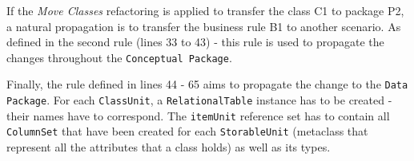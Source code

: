 If the \textit{Move Classes} refactoring is applied to transfer the class C1 to package P2, a natural propagation is to transfer the business rule B1 to another scenario. As defined in the second rule (lines 33 to 43) - this rule is used to propagate the changes throughout the \texttt{Conceptual Package}.




 Finally, the rule defined in lines 44 - 65 aims to propagate the change to the \texttt{Data Package}. For each \texttt{ClassUnit}, a \texttt{RelationalTable} instance has to be created - their names have to correspond. The \texttt{itemUnit} %
reference set has to contain all \texttt{ColumnSet} that have been created for each \texttt{StorableUnit} (metaclass that represent all the attributes that a class holds) as well as its types.



